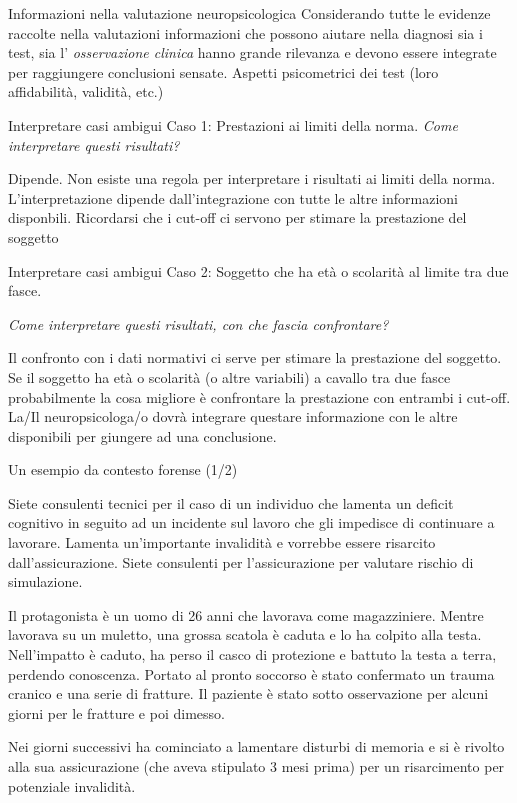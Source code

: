 \documentclass[
  ignorenonframetext,
]{beamer}
\begin{document}
\begin{frame}{Informazioni nella valutazione neuropsicologica}
\label{informazioni-nella-valutazione-neuropsicologica}
Considerando tutte le evidenze raccolte nella valutazioni informazioni
che possono aiutare nella diagnosi sia i test, sia l' \emph{osservazione
clinica} hanno grande rilevanza e devono essere integrate per
raggiungere conclusioni sensate. Aspetti psicometrici dei test (loro
affidabilità, validità, etc.)
\end{frame}

\begin{frame}{Interpretare casi ambigui}
\label{interpretare-casi-ambigui}
Caso 1: Prestazioni ai limiti della norma. \pause \emph{Come
interpretare questi risultati?} \pause

Dipende. Non esiste una regola per interpretare i risultati ai limiti
della norma. L'interpretazione dipende dall'integrazione con tutte le
altre informazioni disponbili. Ricordarsi che i cut-off ci servono per
stimare la prestazione del soggetto
\end{frame}

\begin{frame}{Interpretare casi ambigui}
\label{interpretare-casi-ambigui-1}
Caso 2: Soggetto che ha età o scolarità al limite tra due fasce.

\emph{Come interpretare questi risultati, con che fascia confrontare?}

Il confronto con i dati normativi ci serve per stimare la prestazione
del soggetto. Se il soggetto ha età o scolarità (o altre variabili) a
cavallo tra due fasce probabilmente la cosa migliore è confrontare la
prestazione con entrambi i cut-off. La/Il neuropsicologa/o dovrà
integrare questare informazione con le altre disponibili per giungere ad
una conclusione.
\end{frame}

\begin{frame}{Un esempio da contesto forense (1/2)}
\label{un-esempio-da-contesto-forense-12}
\scriptsize

Siete consulenti tecnici per il caso di un individuo che lamenta un
deficit cognitivo in seguito ad un incidente sul lavoro che gli
impedisce di continuare a lavorare. Lamenta un'importante invalidità e
vorrebbe essere risarcito dall'assicurazione. Siete consulenti per
l'assicurazione per valutare rischio di simulazione.

Il protagonista è un uomo di 26 anni che lavorava come magazziniere.
Mentre lavorava su un muletto, una grossa scatola è caduta e lo ha
colpito alla testa. Nell'impatto è caduto, ha perso il casco di
protezione e battuto la testa a terra, perdendo conoscenza. Portato al
pronto soccorso è stato confermato un trauma cranico e una serie di
fratture. Il paziente è stato sotto osservazione per alcuni giorni per
le fratture e poi dimesso.

Nei giorni successivi ha cominciato a lamentare disturbi di memoria e si
è rivolto alla sua assicurazione (che aveva stipulato 3 mesi prima) per
un risarcimento per potenziale invalidità.
\end{frame}
\end{document}
